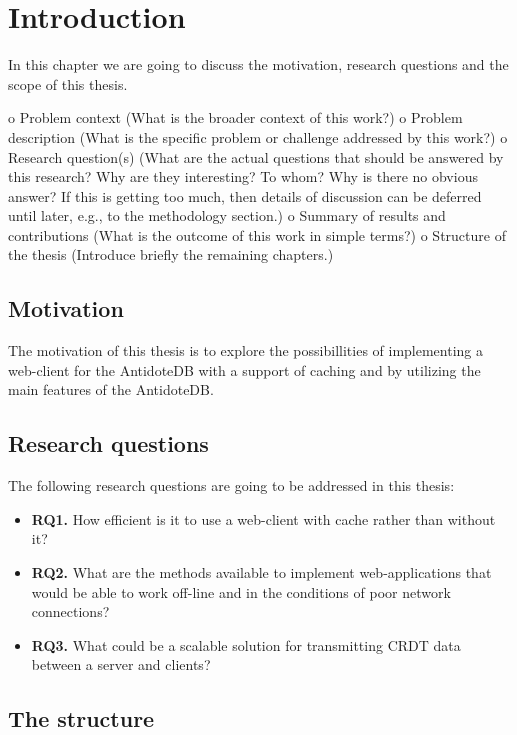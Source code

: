\chapter{Introduction}
\label{Introduction}

In this chapter we are going to discuss the motivation, research questions and the scope of this thesis.

o Problem context (What is the broader context of this work?) 
o Problem description (What is the specific problem or challenge addressed by this work?) 
o Research question(s) (What are the actual questions that should be answered by this research? Why are they interesting? To whom? Why is there no obvious answer? If this is getting too much, then details of discussion can be deferred until later, e.g., to the methodology section.) 
o Summary of results and contributions (What is the outcome of this work in simple terms?) 
o Structure of the thesis (Introduce briefly the remaining chapters.)

\section{Motivation}

The motivation of this thesis is to explore the possibillities of implementing 
a web-client for the AntidoteDB with a support of caching and by utilizing the main features of the AntidoteDB.

\section{Research questions}

The following research questions are going to be addressed in this thesis:

\begin{itemize}
    \item \textbf{RQ1.} How efficient is it to use a web-client with cache rather than without it?
    \item \textbf{RQ2.} What are the methods available to implement web-applications that would be able to work off-line and
    in the conditions of poor network connections?
    \item \textbf{RQ3.} What could be a scalable solution for transmitting CRDT data between a server and clients?
  \end{itemize}





\section{The structure}

